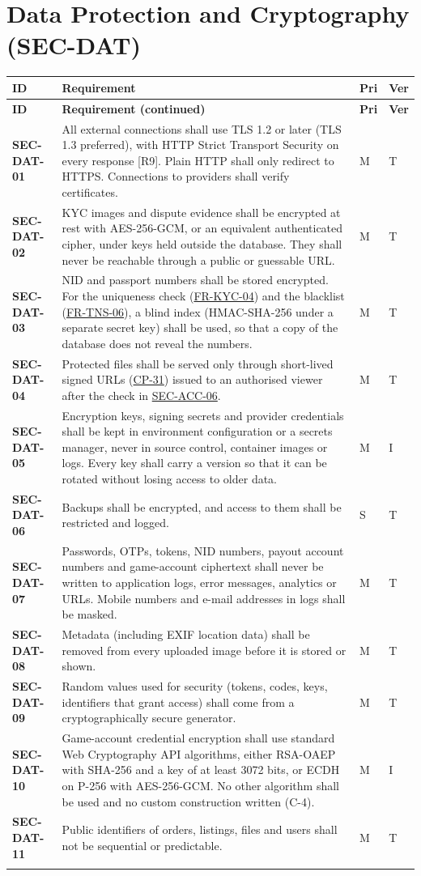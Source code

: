 \documentclass[11pt,a4paper]{report}
\makeatletter
\newenvironment{reqs}{%
  \small
  \begin{longtable}{@{}>{\raggedright\arraybackslash}p{2.35cm}
                       >{\raggedright\arraybackslash}p{10.3cm}
                       >{\centering\arraybackslash}p{0.7cm}
                       >{\centering\arraybackslash}p{0.7cm}@{}}
  \toprule
  \textbf{ID} & \textbf{Requirement} & \textbf{Pri} & \textbf{Ver} \\
  \midrule
  \endfirsthead
  \toprule
  \textbf{ID} & \textbf{Requirement (continued)} & \textbf{Pri} & \textbf{Ver} \\
  \midrule
  \endhead
  \bottomrule
  \endfoot
}{\end{longtable}}
\newcommand{\req}[5]{\leavevmode\textbf{#1}\hypertarget{#1}{} & #5 & #2 & #3 \\ \addlinespace[2pt]}
\newcommand{\rr}[1]{\hyperlink{#1}{#1}}
\newcommand{\cp}[1]{\hyperlink{#1}{#1}}
\makeatother
\begin{document}
\section{Data Protection and Cryptography (SEC-DAT)}
\begin{reqs}
\req{SEC-DAT-01}{M}{T}{new}{All external connections shall use TLS 1.2 or later (TLS 1.3 preferred), with HTTP Strict Transport Security on every response [R9]. Plain HTTP shall only redirect to HTTPS. Connections to providers shall verify certificates.}
\req{SEC-DAT-02}{M}{T}{FR-5, NFR-4}{KYC images and dispute evidence shall be encrypted at rest with AES-256-GCM, or an equivalent authenticated cipher, under keys held outside the database. They shall never be reachable through a public or guessable URL.}
\req{SEC-DAT-03}{M}{T}{new}{NID and passport numbers shall be stored encrypted. For the uniqueness check (\rr{FR-KYC-04}) and the blacklist (\rr{FR-TNS-06}), a blind index (HMAC-SHA-256 under a separate secret key) shall be used, so that a copy of the database does not reveal the numbers.}
\req{SEC-DAT-04}{M}{T}{NFR-4}{Protected files shall be served only through short-lived signed URLs (\cp{CP-31}) issued to an authorised viewer after the check in \rr{SEC-ACC-06}.}
\req{SEC-DAT-05}{M}{I}{NFR-8}{Encryption keys, signing secrets and provider credentials shall be kept in environment configuration or a secrets manager, never in source control, container images or logs. Every key shall carry a version so that it can be rotated without losing access to older data.}
\req{SEC-DAT-06}{S}{T}{new}{Backups shall be encrypted, and access to them shall be restricted and logged.}
\req{SEC-DAT-07}{M}{T}{new}{Passwords, OTPs, tokens, NID numbers, payout account numbers and game-account ciphertext shall never be written to application logs, error messages, analytics or URLs. Mobile numbers and e-mail addresses in logs shall be masked.}
\req{SEC-DAT-08}{M}{T}{new}{Metadata (including EXIF location data) shall be removed from every uploaded image before it is stored or shown.}
\req{SEC-DAT-09}{M}{T}{new}{Random values used for security (tokens, codes, keys, identifiers that grant access) shall come from a cryptographically secure generator.}
\req{SEC-DAT-10}{M}{I}{new}{Game-account credential encryption shall use standard Web Cryptography API algorithms, either RSA-OAEP with SHA-256 and a key of at least 3072 bits, or ECDH on P-256 with AES-256-GCM. No other algorithm shall be used and no custom construction written (C-4).}
\req{SEC-DAT-11}{M}{T}{new}{Public identifiers of orders, listings, files and users shall not be sequential or predictable.}
\end{reqs}
\end{document}
